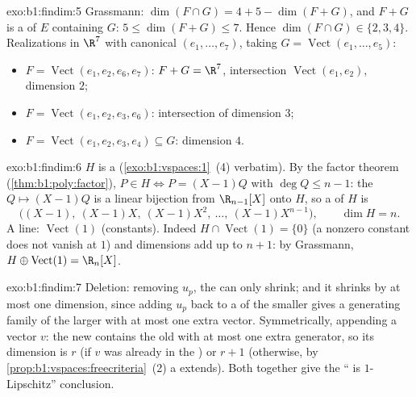 \begin{solution}{exo:b1:findim:5}
Grassmann: $\dim(F \cap G) = 4 + 5 - \dim(F + G)$, and $F + G$ is a
 of $E$ containing $G$: $5 \leq \dim(F+G) \leq 7$. Hence
$\dim(F \cap G) \in \{2, 3, 4\}$. Realizations in $\R^7$ with
canonical  $(e_1, \dots, e_7)$, taking $G =
\operatorname{Vect}(e_1, \dots, e_5)$:
\begin{itemize}
  \item $F = \operatorname{Vect}(e_1, e_2, e_6, e_7)$: $F + G = \R^7$,
        intersection $\operatorname{Vect}(e_1, e_2)$, dimension $2$;
  \item $F = \operatorname{Vect}(e_1, e_2, e_3, e_6)$: intersection
        of dimension $3$;
  \item $F = \operatorname{Vect}(e_1, e_2, e_3, e_4) \subseteq G$:
        dimension $4$.
\end{itemize}
\end{solution}

\begin{solution}{exo:b1:findim:6}
$H$ is a  (\cref{exo:b1:vspaces:1}~(4) verbatim). By the
factor theorem (\cref{thm:b1:poly:factor}), $P \in H \iff P =
(X-1)Q$ with $\deg Q \leq n - 1$: the  $Q \mapsto (X-1)Q$ is a
linear bijection from $\R_{n-1}[X]$ onto $H$, so a  of $H$ is
\[
\bigl((X-1),\ (X-1)X,\ (X-1)X^2,\ \dots,\ (X-1)X^{n-1}\bigr),
\qquad \dim H = n .
\]
A  line: $\operatorname{Vect}(1)$ (constants). Indeed
$H \cap \operatorname{Vect}(1) = \{0\}$ (a nonzero constant does not
vanish at $1$) and dimensions add up to $n + 1$: by Grassmann, $H
\oplus \operatorname{Vect}(1) = \R_n[X]$.
\end{solution}

\begin{solution}{exo:b1:findim:7}
Deletion: removing $u_p$, the  can only shrink; and it shrinks
by at most one dimension, since adding $u_p$ back to a  of the
smaller  gives a generating family of the larger with at most
one extra vector. Symmetrically, appending a vector $v$: the new
 contains the old with at most one extra generator, so its
dimension is $r$ (if $v$ was already in the ) or $r + 1$
(otherwise, by \cref{prop:b1:vspaces:freecriteria}~(2) a 
extends). Both  together give the `` is
$1$-Lipschitz'' conclusion.
\end{solution}

